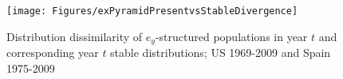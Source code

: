 
\begin{figure}
       \centering
       \caption{Distribution dissimilarity of $e_y$-structured populations in
       year $t$ and corresponding year $t$ stable distributions; US 1969-2009
       and Spain 1975-2009}
        \texttt{[image: Figures/exPyramidPresentvsStableDivergence]}
        \label{fig:exstablepyr}
\end{figure}






